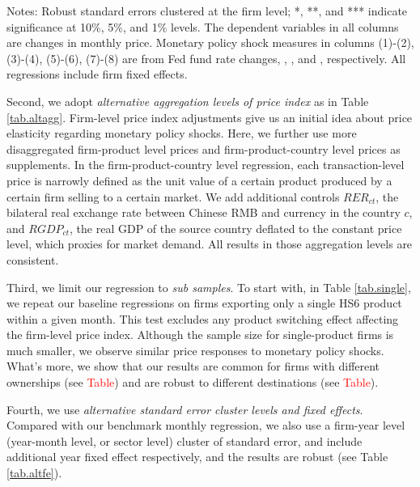 \begin{table}[htbp]
{\begin{threeparttable}
\begin{tabular}{lcccccccc}
        \bottomrule
    \end{tabular}
        \begin{tablenotes}
            \footnotesize
            \item Notes: Robust standard errors clustered at the firm level;  *, **, and *** indicate significance at 10\%, 5\%, and 1\% levels. The dependent variables in all columns are changes in monthly price. Monetary policy shock measures in columns (1)-(2), (3)-(4), (5)-(6), (7)-(8) are from Fed fund rate changes, \cite{nakamura2018high}, \cite{acosta2022perceived}, and \cite{jarocinski2020deconstructing}, respectively. All regressions include firm fixed effects.
	\end{tablenotes}
    \end{threeparttable}
    }
    \label{tab.altmps}
\end{table}

Second, we adopt \textit{alternative aggregation levels of price index} as in Table \ref{tab.altagg}. Firm-level price index adjustments give us an initial idea about price elasticity regarding monetary policy shocks. Here, we further use more disaggregated firm-product level prices and firm-product-country level prices as supplements. In the firm-product-country level regression, each transaction-level price is narrowly defined as the unit value of a certain product produced by a certain firm selling to a certain market. We add additional controls $RER_{ct}$, the bilateral real exchange rate between Chinese RMB and currency in the country $c$, and $RGDP_{ct}$, the real GDP of the source country deflated to the constant price level, which proxies for market demand. All results in those aggregation levels are consistent. 

Third, we limit our regression to \textit{sub samples}. To start with, in Table \ref{tab.single}, we repeat our baseline regressions on firms exporting only a single HS6 product within a given month. This test excludes any product switching effect affecting the firm-level price index. Although the sample size for single-product firms is much smaller, we observe similar price responses to monetary policy shocks. What's more, we show that our results are common for firms with different ownerships (see \textcolor{red}{Table}) and are robust to different destinations (see \textcolor{red}{Table}).

Fourth, we use \textit{alternative standard error cluster levels and fixed effects}. Compared with our benchmark monthly regression, we also use a firm-year level (year-month level, or sector level) cluster of standard error, and include additional year fixed effect respectively, and the results are robust (see Table \ref{tab.altfe}).

